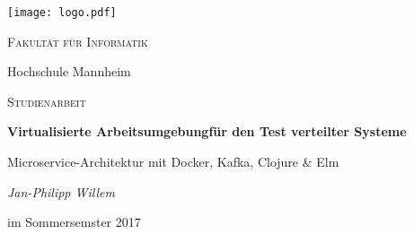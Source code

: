 \begin{titlepage}
{\texttt{[image: logo.pdf]}}\par
\vspace{4cm}
\centering
{\scshape\LARGE Fakultät für Informatik \par Hochschule Mannheim\par}
\vspace{1cm}
{\scshape\Large Studienarbeit\par}
\vspace{.5cm}
{\huge\bfseries Virtualisierte Arbeitsumgebung\break für den Test verteilter Systeme\par}
{\LARGE Microservice-Architektur mit Docker, Kafka, Clojure \& Elm\par}
\vspace{1cm}
{\Large\itshape Jan-Philipp Willem\par}
\vspace{.5cm}
{\Large im Sommersemster 2017}
\vfill
\end{titlepage}
